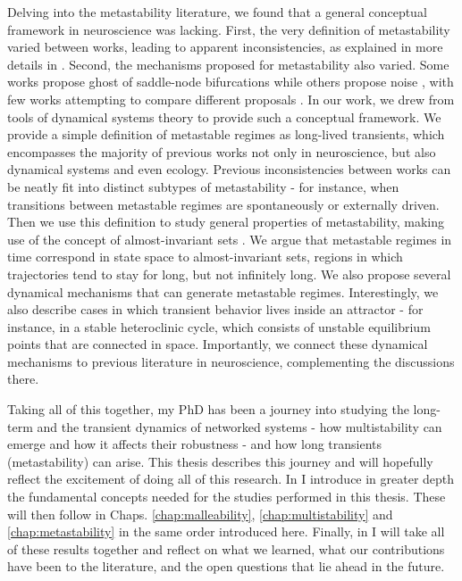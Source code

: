 Delving into the metastability literature, we found that a general conceptual framework in neuroscience was lacking. First, the very definition of metastability varied between works, leading to apparent inconsistencies, as explained in more details in . Second, the mechanisms proposed for metastability also varied. Some works propose ghost of saddle-node bifurcations \cite{tognoli2014metastable} while others propose noise \cite{brinkman2022metastable}, with few works attempting to compare different proposals \cite{graben2019metastable}. In our work, we drew from tools of dynamical systems theory to provide such a conceptual framework. We provide a simple definition of metastable regimes as long-lived transients, which encompasses the majority of previous works not only in neuroscience, but also dynamical systems and even ecology. Previous inconsistencies between works can be neatly fit into distinct subtypes of metastability - for instance, when transitions between metastable regimes are spontaneously or externally driven.
Then we use this definition to study general properties of metastability, making use of the concept of almost-invariant sets \cite{dellnitz2003congestion, froyland2005statistically}. We argue that metastable regimes in time correspond in state space to almost-invariant sets, regions in which trajectories tend to stay for long, but not infinitely long. We also propose several dynamical mechanisms that can generate metastable regimes. Interestingly, we also describe cases in which transient behavior lives inside an attractor - for instance, in a stable heteroclinic cycle, which consists of unstable equilibrium points that are connected in space. Importantly, we connect these dynamical mechanisms to previous literature in neuroscience, complementing the discussions there.   

Taking all of this together, my PhD has been a journey into studying the long-term and the transient dynamics of networked systems - how multistability can emerge and how it affects their robustness - and how long transients (metastability) can arise.  This thesis describes this journey and will hopefully reflect the excitement of doing all of this research. In  I introduce in greater depth the fundamental concepts needed for the studies performed in this thesis. These will then follow in Chaps. \ref{chap:malleability}, \ref{chap:multistability} and \ref{chap:metastability} in the same order introduced here. Finally, in  I will take all of these results together and reflect on what we learned, what our contributions have been to the literature, and the open questions that lie ahead in the future. 

